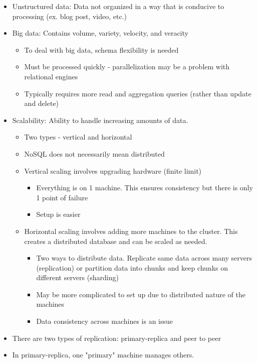 \documentclass[8pt,landscape,a4paper, fleqn, dvipsnames]{extarticle}
\begin{document}
\begin{multicols*}{4}
\begin{itemize}
    \item Unstructured data: Data not organized in a way that is conducive to processing (ex. blog post, video, etc.)
    \item Big data: Contains volume, variety, velocity, and veracity
    \begin{itemize}
        \item To deal with big data, schema flexibility is needed
        \item Must be processed quickly - parallelization may be a problem with relational engines
        \item Typically requires more read and aggregation queries (rather than update and delete)
    \end{itemize}
    \item Scalability: Ability to handle increasing amounts of data. 
    \begin{itemize}
        \item Two types - vertical and horizontal
        \item NoSQL does not necessarily mean distributed
        \item Vertical scaling involves upgrading hardware (finite limit)
        \begin{itemize}
            \item Everything is on 1 machine. This ensures consistency but there is only 1 point of failure
            \item Setup is easier
        \end{itemize}
        \item Horizontal scaling involves adding more machines to the cluster. This creates a distributed database and can be scaled as needed.
        \begin{itemize}
            \item Two ways to distribute data. Replicate same data across many servers (replication) or partition data into chunks and keep chunks on different servers (sharding)
            \item May be more complicated to set up due to distributed nature of the machines
            \item Data consistency across machines is an issue
        \end{itemize}
    \end{itemize}
    \item There are two types of replication: primary-replica and peer to peer
    \item In primary-replica, one "primary" machine manages others.

\end{itemize}
\end{multicols*}
\end{document}

